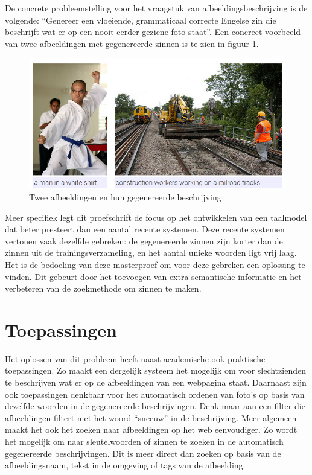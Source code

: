 De concrete probleemstelling voor het vraagstuk van afbeeldingsbeschrijving is de volgende: ``Genereer een vloeiende, grammaticaal correcte Engelse zin die beschrijft wat er op een nooit eerder geziene foto staat''. Een concreet voorbeeld van twee afbeeldingen met gegenereerde zinnen is te zien in figuur \ref{fig:examplecaptions}.

\begin{figure}[tb]
    \centering
    \includegraphics[width= 0.85\linewidth]{Images/caption.PNG}
    \caption{Twee afbeeldingen en hun gegenereerde beschrijving}
    \label{fig:examplecaptions}
\end{figure}

Meer specifiek legt dit proefschrift de focus op het ontwikkelen van een taalmodel dat beter presteert dan een aantal recente systemen. Deze recente systemen vertonen vaak dezelfde gebreken: de gegenereerde zinnen zijn korter dan de zinnen uit de trainingsverzameling, en het aantal unieke woorden ligt vrij laag. Het is de bedoeling van deze masterproef om voor deze gebreken een oplossing te vinden. Dit gebeurt door het toevoegen van extra semantische informatie en het verbeteren van de zoekmethode om zinnen te maken.


\section{Toepassingen}
Het oplossen van dit probleem heeft naast academische ook praktische toepassingen. Zo maakt een dergelijk systeem het mogelijk om voor slechtzienden te beschrijven wat er op de afbeeldingen van een webpagina staat. Daarnaast zijn ook toepassingen denkbaar voor het automatisch ordenen van foto's op basis van dezelfde woorden in de gegenereerde beschrijvingen. Denk maar aan een filter die afbeeldingen filtert met het woord ``sneeuw'' in de beschrijving. Meer algemeen maakt het ook het zoeken naar afbeeldingen op het web eenvoudiger. Zo wordt het mogelijk om naar sleutelwoorden of zinnen te zoeken in de automatisch gegenereerde beschrijvingen. Dit is meer direct dan zoeken op basis van de afbeeldingsnaam, tekst in de omgeving of tags van de afbeelding.


